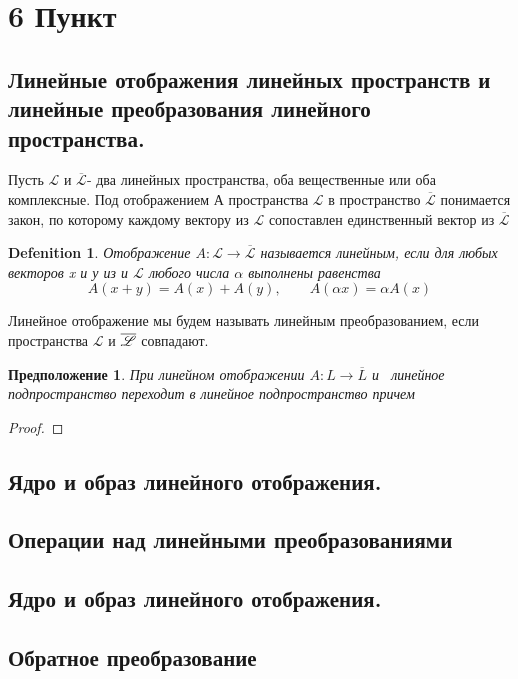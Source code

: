 \documentclass[11pt; a4paper]{report}
\theoremstyle{plain} %
\newtheorem{sug}{Предположение}[section]
\theoremstyle{defenition}
\newtheorem{glob_def}{Defenition}
\theoremstyle{remark}
\begin{document}
\newpage
\section{\Large 6 Пункт}
\subsection{Линейные отображения линейных пространств и линейные преобразования линейного пространства.}
Пусть  $\mathscr{L}$ и $\overline{\mathscr{L}}$- два линейных пространства, оба вещественные
или оба комплексные. Под отображением А про­странства $\mathscr{L}$ в пространство
 $\overline{\mathscr{L}}$ понимается закон, по которому каж­дому вектору из $\mathscr{L}$ 
 сопоставлен единственный вектор из $\overline{\mathscr{L}}$
\begin{glob_def}
    Отображение $A: \mathscr{L} \rightarrow \overline{\mathscr{L}}$ называется линейным, если
     для любых векторов x и у из и $\mathscr{L}$ любого числа $\alpha$ выполнены равенства
    \begin{equation}
        A(x + y) = A(x) + A(y),\qquad A(\alpha x) = \alpha A(x)
    \end{equation}
\end{glob_def}
Линейное отображение мы будем называть линейным преобразова­нием, если пространства
 $\mathscr{L}$ и $\overline{\mathscr{L}}$ совпадают.
 
\begin{sug}\label{sug}
При линейном отображении $A: L \rightarrow \overline{L} $ и­  линейное подпространство переходит в линейное подпрост­ранство причем
\end{sug}
\begin{proof} 

\end{proof}


\subsection{Ядро и образ линейного отображения.}
\subsection{Операции над линейными преобразованиями}
\subsection{Ядро и образ линейного отображения.}
\subsection{Обратное преобразование}
\end{document}
